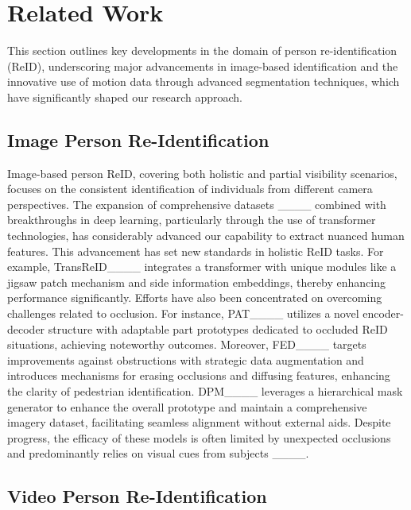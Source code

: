 \section{Related Work}
\label{sec:related}

This section outlines key developments in the domain of person re-identification (ReID), underscoring major advancements in image-based identification and the innovative use of motion data through advanced segmentation techniques, which have significantly shaped our research approach.

\subsection{Image Person Re-Identification}

Image-based person ReID, covering both holistic and partial visibility scenarios, focuses on the consistent identification of individuals from different camera perspectives. The expansion of comprehensive datasets ____ combined with breakthroughs in deep learning, particularly through the use of transformer technologies, has considerably advanced our capability to extract nuanced human features. This advancement has set new standards in holistic ReID tasks. For example, TransReID____ integrates a transformer with unique modules like a jigsaw patch mechanism and side information embeddings, thereby enhancing performance significantly. Efforts have also been concentrated on overcoming challenges related to occlusion. For instance, PAT____ utilizes a novel encoder-decoder structure with adaptable part prototypes dedicated to occluded ReID situations, achieving noteworthy outcomes. Moreover, FED____ targets improvements against obstructions with strategic data augmentation and introduces mechanisms for erasing occlusions and diffusing features, enhancing the clarity of pedestrian identification. DPM____ leverages a hierarchical mask generator to enhance the overall prototype and maintain a comprehensive imagery dataset, facilitating seamless alignment without external aids. Despite progress, the efficacy of these models is often limited by unexpected occlusions and predominantly relies on visual cues from subjects ____.

\subsection{Video Person Re-Identification}

